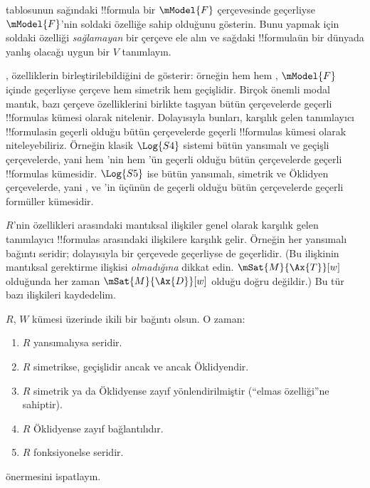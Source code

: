 \documentclass[../../../include/open-logic-section]{subfiles}
\begin{document}
\begin{prob}
 tablosunun sağındaki !!{formula}
bir $\mModel{F}$ çerçevesinde geçerliyse $\mModel{F}$'nin soldaki özelliğe
sahip olduğunu gösterin. Bunu yapmak için soldaki özelliği
\emph{sağlamayan} bir çerçeve ele alın ve sağdaki !!{formula}{}ün bir
dünyada yanlış olacağı uygun bir $V$ tanımlayın.
\end{prob}

, özelliklerin birleştirilebildiğini de
gösterir: örneğin hem  hem , $\mModel{F}$ içinde geçerliyse
çerçeve hem simetrik hem geçişlidir. Birçok önemli modal mantık, bazı
çerçeve özelliklerini birlikte taşıyan bütün çerçevelerde geçerli
!!{formula}s kümesi olarak nitelenir. Dolayısıyla bunları, karşılık gelen
tanımlayıcı !!{formula}s{}in geçerli olduğu bütün çerçevelerde geçerli
!!{formula}s kümesi olarak niteleyebiliriz. Örneğin klasik $\Log{S4}$
sistemi bütün yansımalı ve geçişli çerçevelerde, yani hem 'nin hem
'ün geçerli olduğu bütün çerçevelerde geçerli !!{formula}s kümesidir.
$\Log{S5}$ ise bütün yansımalı, simetrik ve Öklidyen çerçevelerde, yani
,  ve 'in üçünün de geçerli olduğu bütün çerçevelerde
geçerli formüller kümesidir.

$R$'nin özellikleri arasındaki mantıksal ilişkiler genel olarak karşılık
gelen tanımlayıcı !!{formula}s arasındaki ilişkilere karşılık gelir.
Örneğin her yansımalı bağıntı seridir; dolayısıyla  bir çerçevede
geçerliyse  de geçerlidir. (Bu ilişkinin mantıksal gerektirme ilişkisi
\emph{olmadığına} dikkat edin. $\mSat{M}{\Ax{T}}[w]$ olduğunda her zaman
$\mSat{M}{\Ax{D}}[w]$ olduğu doğru değildir.) Bu tür bazı ilişkileri
kaydedelim.

\begin{prop}
  $R$, $W$ kümesi üzerinde ikili bir bağıntı olsun. O zaman:
  \begin{enumerate}
  \item $R$ yansımalıysa seridir.
  \item $R$ simetrikse, geçişlidir ancak ve ancak Öklidyendir.
  \item $R$ simetrik ya da Öklidyense zayıf yönlendirilmiştir
    (``elmas özelliği''ne sahiptir).
  \item $R$ Öklidyense zayıf bağlantılıdır.
  \item $R$ fonksiyonelse seridir.
  \end{enumerate}
\end{prop}

\begin{prob}
   önermesini ispatlayın.
\end{prob}
\end{document}
